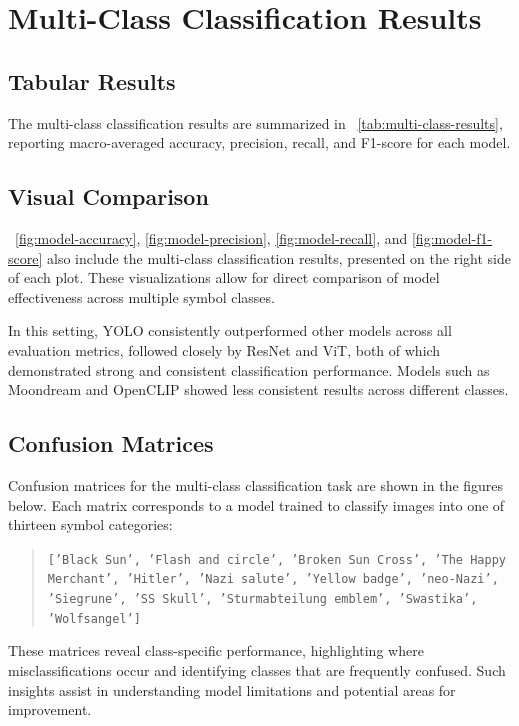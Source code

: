 \section{Multi-Class Classification Results}

\subsection{Tabular Results}

The multi-class classification results are summarized in ~\autoref{tab:multi-class-results}, reporting
macro-averaged accuracy, precision, recall, and F1-score for each model.



\subsection{Visual Comparison}

~\autoref{fig:model-accuracy}, \autoref{fig:model-precision}, \autoref{fig:model-recall}, and
\autoref{fig:model-f1-score} also include the multi-class classification results, presented on the right side of
each plot. These visualizations allow for direct comparison of model effectiveness across multiple symbol classes.

In this setting, \ac{YOLO} consistently outperformed other models across all evaluation metrics, followed closely by
\ac{ResNet} and \ac{ViT}, both of which demonstrated strong and consistent classification performance. Models such as
Moondream and OpenCLIP showed less consistent results across different classes.

\subsection{Confusion Matrices}

Confusion matrices for the multi-class classification task are shown in the figures below. Each matrix corresponds
to a model trained to classify images into one of thirteen symbol categories:

\begin{quote}
\texttt{['Black Sun', 'Flash and circle', 'Broken Sun Cross', 'The Happy Merchant', 'Hitler', 'Nazi salute',
  'Yellow badge', 'neo-Nazi', 'Siegrune', 'SS Skull', 'Sturmabteilung emblem', 'Swastika', 'Wolfsangel']}
\end{quote}

These matrices reveal class-specific performance, highlighting where misclassifications occur and identifying
classes that are frequently confused. Such insights assist in understanding model limitations and potential areas
for improvement.

